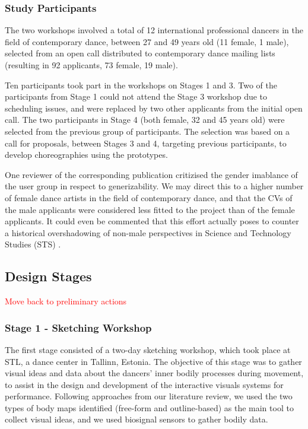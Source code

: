 
\subsubsection{Study Participants}

The two workshops involved a total of 12 international professional dancers in the field of contemporary dance, between 27 and 49 years old (11 female, 1 male), selected from an open call distributed to contemporary dance mailing lists (resulting in 92 applicants, 73 female, 19 male).

Ten participants took part in the workshops on Stages 1 and 3. Two of the participants from Stage 1 could not attend the Stage 3 workshop due to scheduling issues, and were replaced by two other applicants from the initial open call. The two participants in Stage 4 (both female, 32 and 45 years old) were selected from the previous group of participants. The selection was based on a call for proposals, between Stages 3 and 4, targeting previous participants, to develop choreographies using the prototypes.

One reviewer of the corresponding publication critizised the gender imablance of the user group in respect to generizability. We may direct this to a higher number of female dance artists in the field of contemporary dance, and that the CVs of the male applicants were considered less fitted to the project than of the female applicants. It could even be commented that this effort actually poses to counter a historical overshadowing of non-male perspectives in Science and Technology Studies (STS) \cite{wajcman_feminist_2010,hook_soma_2019}.

\subsection{Design Stages}

\textcolor{red}{Move back to preliminary actions}
\subsubsection{Stage 1 - Sketching Workshop}

The first stage consisted of a two-day sketching workshop, which
took place at STL, a dance center in Tallinn, Estonia. The objective of this stage was to gather visual ideas and data about the dancers’ inner bodily processes during movement, to assist in the design and development of the interactive visuals systems for performance. Following approaches from our literature review, we used the two types of body maps identified (free-form and outline-based) as the main tool to collect visual ideas, and we used biosignal sensors to gather bodily data.

